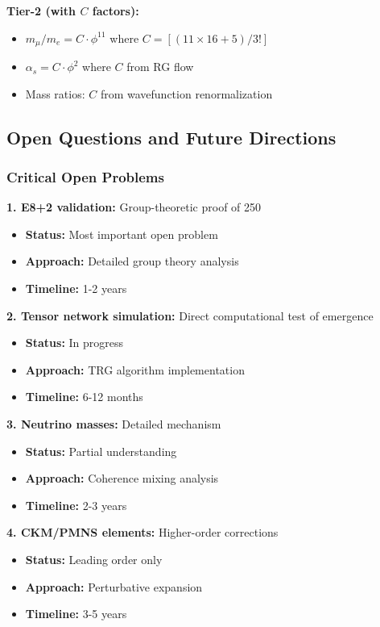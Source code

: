 \documentclass[11pt]{article}
\theoremstyle{definition}
\newcommand{\goldenratio}{\phi}
\begin{document}
\textbf{Tier-2 (with $C$ factors):}
\begin{itemize}
\item $m_\mu/m_e = C \cdot \goldenratio^{11}$ where $C = [(11\times16+5)/3!]$
\item $\alpha_s = C \cdot \goldenratio^2$ where $C$ from RG flow
\item Mass ratios: $C$ from wavefunction renormalization
\end{itemize}

\subsection{Open Questions and Future Directions}

\subsubsection{Critical Open Problems}

\textbf{1. E8+2 validation:} Group-theoretic proof of 250
\begin{itemize}
\item \textbf{Status:} Most important open problem
\item \textbf{Approach:} Detailed group theory analysis
\item \textbf{Timeline:} 1-2 years
\end{itemize}

\textbf{2. Tensor network simulation:} Direct computational test of emergence
\begin{itemize}
\item \textbf{Status:} In progress
\item \textbf{Approach:} TRG algorithm implementation
\item \textbf{Timeline:} 6-12 months
\end{itemize}

\textbf{3. Neutrino masses:} Detailed mechanism
\begin{itemize}
\item \textbf{Status:} Partial understanding
\item \textbf{Approach:} Coherence mixing analysis
\item \textbf{Timeline:} 2-3 years
\end{itemize}

\textbf{4. CKM/PMNS elements:} Higher-order corrections
\begin{itemize}
\item \textbf{Status:} Leading order only
\item \textbf{Approach:} Perturbative expansion
\item \textbf{Timeline:} 3-5 years
\end{itemize}
\end{document}
